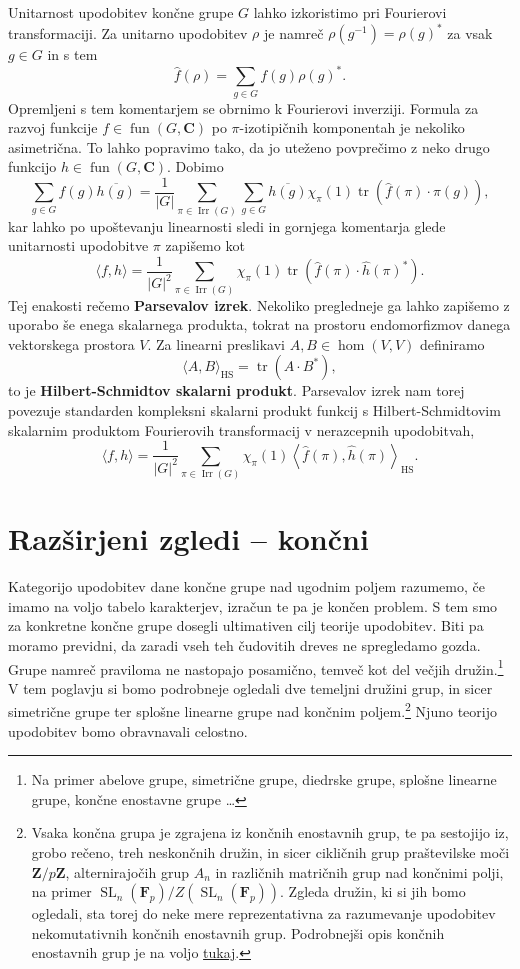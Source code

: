 \documentclass[11pt]{book}
\def\ZZ{\mathbf{Z}}
\def\CC{\mathbf{C}}
\def\FF{\mathbf{F}}
\DeclareMathOperator\tr{tr}
\DeclareMathOperator\Irr{Irr}
\DeclareMathOperator\fun{fun}
\DeclareMathOperator\HS{HS}
\DeclareMathOperator\SL{SL}
\def\definicija{\color{rdeca}\bf}
\theoremstyle{definition}
\theoremstyle{zgled}
\theoremstyle{zgledbrezstevilke}
\theoremstyle{odprtproblem}
\theoremstyle{domacanaloga}
\theoremstyle{izrek}
\begin{document}
Unitarnost upodobitev končne grupe $G$ lahko izkoristimo pri Fourierovi transformaciji. Za unitarno upodobitev $\rho$ je namreč $\rho(g^{-1}) = \rho(g)^*$ za vsak $g \in G$ in s tem
\[
    \hat{f}(\rho) = \sum_{g \in G} f(g) \rho(g)^*.
\]
Opremljeni s tem komentarjem se obrnimo k Fourierovi inverziji. Formula za razvoj funkcije $f \in \fun(G,\CC)$ po $\pi$-izotipičnih komponentah je nekoliko asimetrična. To lahko popravimo tako, da jo uteženo povprečimo z neko drugo funkcijo $h \in \fun(G,\CC)$. Dobimo
\[
    \sum_{g \in G} f(g) \overline{h(g)} = \frac{1}{|G|} \sum_{\pi \in \Irr(G)} \sum_{g \in G} \overline{h(g)} \chi_{\pi}(1) \tr \left( \hat{f}(\pi) \cdot \pi(g) \right),
\]
kar lahko po upoštevanju linearnosti sledi in gornjega komentarja glede unitarnosti upodobitve $\pi$ zapišemo kot
\[
    \langle f, h \rangle = \frac{1}{|G|^2} \sum_{\pi \in \Irr(G)} \chi_{\pi}(1) \tr(\hat{f}(\pi) \cdot \hat{h}(\pi)^*).
\]
Tej enakosti rečemo {\definicija Parsevalov izrek}. Nekoliko pregledneje ga lahko zapišemo z uporabo še enega skalarnega produkta, tokrat na prostoru endomorfizmov danega vektorskega prostora $V$. Za linearni preslikavi $A,B \in \hom(V,V)$ definiramo
\[
    \langle A, B \rangle_{\HS} = \tr(A \cdot B^*),
\]
to je {\definicija Hilbert-Schmidtov skalarni produkt}. Parsevalov izrek nam torej povezuje standarden kompleksni skalarni produkt funkcij s Hilbert-Schmidtovim skalarnim produktom Fourierovih transformacij v nerazcepnih upodobitvah,
\[
    \langle f, h \rangle = \frac{1}{|G|^2} \sum_{\pi \in \Irr(G)} \chi_{\pi}(1) \left\langle \hat{f}(\pi), \hat{h}(\pi) \right\rangle_{\HS}.
\]

\chapter{Razširjeni zgledi -- končni}

Kategorijo upodobitev dane končne grupe nad ugodnim poljem razumemo, če imamo na voljo tabelo karakterjev, izračun te pa je končen problem. S tem smo za konkretne končne grupe dosegli ultimativen cilj teorije upodobitev. Biti pa moramo previdni, da zaradi vseh teh čudovitih dreves ne spregledamo gozda. Grupe namreč praviloma ne nastopajo posamično, temveč kot del večjih družin.\footnote{Na primer abelove grupe, simetrične grupe, diedrske grupe, splošne linearne grupe, končne enostavne grupe  \dots} V tem poglavju si bomo podrobneje ogledali dve temeljni družini grup, in sicer simetrične grupe ter splošne linearne grupe nad končnim poljem.\footnote{Vsaka končna grupa je zgrajena iz končnih enostavnih grup, te pa sestojijo iz, grobo rečeno, treh neskončnih družin, in sicer cikličnih grup praštevilske moči $\ZZ/p\ZZ$, alternirajočih grup $A_n$ in različnih matričnih grup nad končnimi polji, na primer $\SL_n(\FF_p)/Z(\SL_n(\FF_p))$. Zgleda družin, ki si jih bomo ogledali, sta torej do neke mere reprezentativna za razumevanje upodobitev nekomutativnih končnih enostavnih grup. Podrobnejši opis končnih enostavnih grup je na voljo \href{https://en.wikipedia.org/wiki/List_of_finite_simple_groups}{tukaj}.} Njuno teorijo upodobitev bomo obravnavali celostno.
\end{document}
